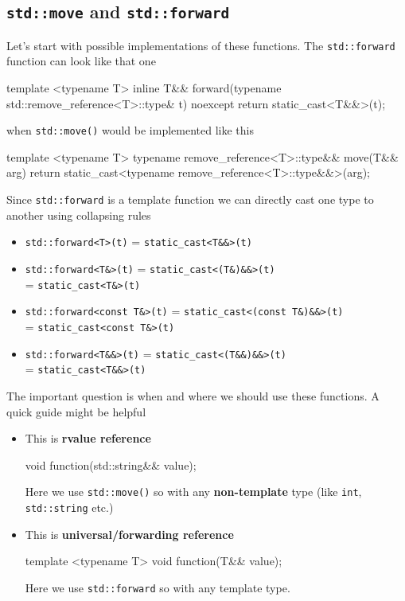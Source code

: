 \documentclass[../main]{subfiles}
\begin{document}
\subsection{\texttt{std::move} and \texttt{std::forward}}
    Let's start with possible implementations of these functions. The \texttt{std::forward} function can look like that one
\begin{Code}
    template <typename T>
    inline T&& forward(typename std::remove_reference<T>::type& t) noexcept
    {
        return static_cast<T&&>(t);
    }
\end{Code}
\noindent
when \texttt{std::move()} would be implemented like this
\begin{Code}
    template <typename T>
    typename remove_reference<T>::type&& move(T&& arg)
    {
        return static_cast<typename remove_reference<T>::type&&>(arg);
    }
\end{Code}
\noindent
Since \texttt{std::forward} is a template function we can directly cast one type to another using collapsing rules
\begin{itemize}
    \item \texttt{std::forward<T>(t)} = \texttt{static\_cast<T\&\&>(t)}
    \item \texttt{std::forward<T\&>(t)} = \texttt{static\_cast<(T\&)\&\&>(t)} \\ = \texttt{static\_cast<T\&>(t)}
    \item \texttt{std::forward<const T\&>(t)} = \texttt{static\_cast<(const T\&)\&\&>(t)} \\ = \texttt{static\_cast<const T\&>(t)}
    \item \texttt{std::forward<T\&\&>(t)} = \texttt{static\_cast<(T\&\&)\&\&>(t)} \\ = \texttt{static\_cast<T\&\&>(t)}
\end{itemize}

    The important question is when and where we should use these functions. A quick guide might be helpful
\begin{itemize}
    \item This is \textbf{rvalue reference}
    \begin{Code}
        void function(std::string&& value);
    \end{Code}
    \noindent
    Here we use \texttt{std::move()} so with any \textbf{non-template} type (like \texttt{int}, \texttt{std::string} etc.)
    \item This is \textbf{universal/forwarding reference}
    \begin{Code}
        template <typename T>
        void function(T&& value);
    \end{Code}
    \noindent
    Here we use \texttt{std::forward} so with any template type.
\end{itemize}
\end{document}
